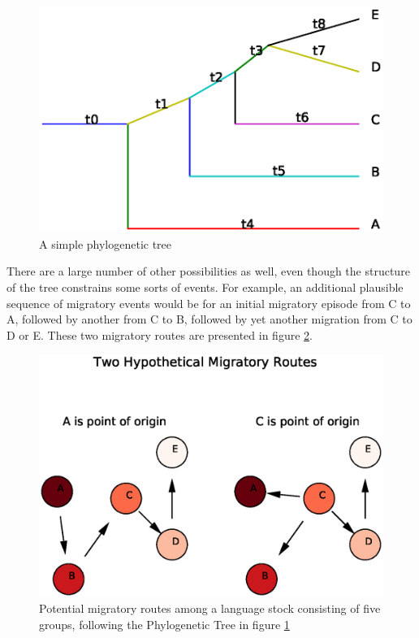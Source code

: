 \documentclass[11pt]{article}
\begin{document}
\begin{figure}
\begin{center}
\includegraphics[width=\textwidth]{simplePT.eps}
\caption{A simple phylogenetic tree}
\end{center} \label{fig1}
\end{figure}

There are a large number of other possibilities as well, even though the structure of the tree constrains some sorts of events. For example, an additional plausible sequence of migratory events would be for an initial migratory episode from C to A, followed by another from C to B, followed by yet another migration from C to D or E. These two migratory routes are presented in figure \ref{fig2}.

\begin{figure}
\begin{center}
\includegraphics[width=\textwidth]{simpleMR.eps}
\caption{Potential migratory routes among a language stock consisting of five groups, following the Phylogenetic Tree in figure \ref{fig1}}
\end{center} \label{fig2}
\end{figure}
\end{document}
